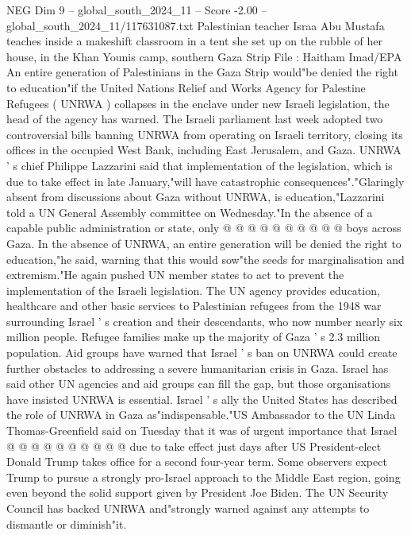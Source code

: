 \begin{textsample}{NEG Dim 9 – global\_south\_2024\_11 – Score -2.00 – global\_south\_2024\_11/117631087.txt}  \label{ex:f9_neg_310}
Palestinian teacher Israa Abu Mustafa teaches inside a makeshift classroom in a tent she set up on the rubble of her house, in the Khan Younis camp, southern Gaza Strip File : Haitham Imad/EPA An entire generation of Palestinians in the Gaza Strip would"be denied the right to education"if the United Nations Relief and Works Agency for Palestine Refugees ( UNRWA ) collapses in the enclave under new Israeli legislation, the head of the agency has warned.
The Israeli parliament last week adopted two controversial bills banning UNRWA from operating on Israeli territory, closing its offices in the occupied West Bank, including East Jerusalem, and Gaza.
UNRWA ' s chief Philippe Lazzarini said that implementation of the legislation, which is due to take effect in late January,"will have catastrophic consequences"."Glaringly absent from discussions about Gaza without UNRWA, is education,"Lazzarini told a UN General Assembly committee on Wednesday."In the absence of a capable public administration or state, only @ @ @ @ @ @ @ @ @ @ boys across Gaza.
In the absence of UNRWA, an entire generation will be denied the right to education,"he said, warning that this would sow"the seeds for marginalisation and extremism."He again pushed UN member states to act to prevent the implementation of the Israeli legislation.
The UN agency provides education, healthcare and other basic services to Palestinian refugees from the 1948 war surrounding Israel ' s creation and their descendants, who now number nearly six million people.
Refugee families make up the majority of Gaza ' s 2.3 million population.
Aid groups have warned that Israel ' s ban on UNRWA could create further obstacles to addressing a severe humanitarian crisis in Gaza.
Israel has said other UN agencies and aid groups can fill the gap, but those organisations have insisted UNRWA is essential.
Israel ' s ally the United States has described the role of UNRWA in Gaza as"indispensable."US Ambassador to the UN Linda Thomas-Greenfield said on Tuesday that it was of urgent importance that Israel @ @ @ @ @ @ @ @ @ @ due to take effect just days after US President-elect Donald Trump takes office for a second four-year term.
Some observers expect Trump to pursue a strongly pro-Israel approach to the Middle East region, going even beyond the solid support given by President Joe Biden.
The UN Security Council has backed UNRWA and"strongly warned against any attempts to dismantle or diminish"it.

\end{textsample}
